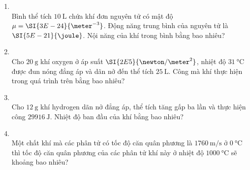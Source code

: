 \begin{enumerate}[label=\bfseries Câu \arabic*:, leftmargin=1.7cm]
\item {}\\
Bình thể tích $\SI{10}{\liter}$ chứa khí đơn nguyên tử có mật độ $\mu=\SI{3E-24}{\meter^{-3}}$. Động năng trung bình của nguyên tử là $\SI{5E-21}{\joule}$. Nội năng của khí trong bình bằng bao nhiêu?

\item {}\\
Cho $\SI{20}{\gram}$ khí oxygen ở áp suất $\SI{2E5}{\newton/\meter^2}$, nhiệt độ $\SI{31}{\celsius}$ được đun nóng đẳng áp và dãn nở đến thể tích $\SI{25}{\liter}$. Công mà khí thực hiện trong quá trình trên bằng bao nhiêu?

\item {}\\
Cho $\SI{12}{\gram}$ khí hydrogen dãn nở đẳng áp, thể tích tăng gấp ba lần và thực hiện công $\SI{29916}{\joule}$. Nhiệt độ ban đầu của khí bằng bao nhiêu?

\item {}\\
Một chất khí mà các phân tử có tốc độ căn quân phương là $\SI{1760}{\meter/\second}$ ở $\SI{0}{\celsius}$ thì tốc độ căn quân phương của các phân tử khí này ở nhiệt độ $\SI{1000}{\celsius}$ sẽ khoảng bao nhiêu?


\end{enumerate}
